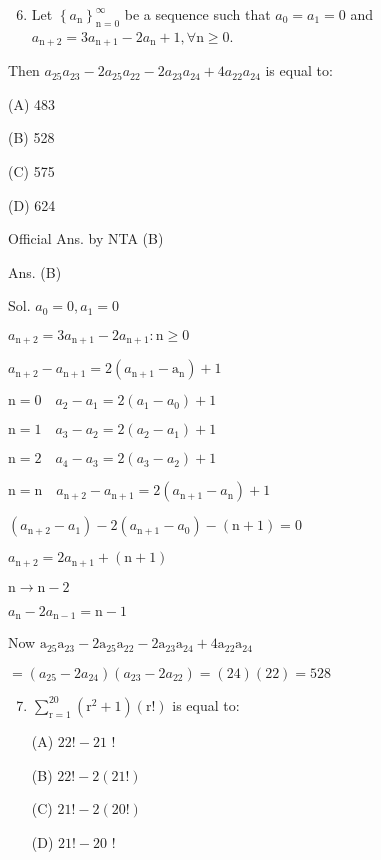 \documentclass[10pt]{article}
\begin{document}
\begin{enumerate}
  \setcounter{enumi}{5}
  \item Let $\left\{a_{\mathrm{n}}\right\}_{\mathrm{n}=0}^{\infty}$ be a sequence such that $a_{0}=a_{1}=0$ and $a_{\mathrm{n}+2}=3 a_{\mathrm{n}+1}-2 a_{\mathrm{n}}+1, \forall \mathrm{n} \geq 0$.
\end{enumerate}

Then $a_{25} a_{23}-2 a_{25} a_{22}-2 a_{23} a_{24}+4 a_{22} a_{24}$ is equal to:

(A) 483

(B) 528

(C) 575

(D) 624

Official Ans. by NTA (B)

Ans. (B)

Sol. $a_{0}=0, a_{1}=0$

$a_{\mathrm{n}+2}=3 a_{\mathrm{n}+1}-2 a_{\mathrm{n}+1}: \mathrm{n} \geq 0$

$a_{\mathrm{n}+2}-a_{\mathrm{n}+1}=2\left(a_{\mathrm{n}+1}-\mathrm{a}_{\mathrm{n}}\right)+1$

$\mathrm{n}=0 \quad a_{2}-a_{1}=2\left(a_{1}-a_{0}\right)+1$

$\mathrm{n}=1 \quad a_{3}-a_{2}=2\left(a_{2}-a_{1}\right)+1$

$\mathrm{n}=2 \quad a_{4}-a_{3}=2\left(a_{3}-a_{2}\right)+1$

$\mathrm{n}=\mathrm{n} \quad a_{\mathrm{n}+2}-a_{\mathrm{n}+1}=2\left(a_{\mathrm{n}+1}-a_{\mathrm{n}}\right)+1$

$\left(a_{\mathrm{n}+2}-a_{1}\right)-2\left(a_{\mathrm{n}+1}-a_{0}\right)-(\mathrm{n}+1)=0$

$a_{\mathrm{n}+2}=2 a_{\mathrm{n}+1}+(\mathrm{n}+1)$

$\mathrm{n} \rightarrow \mathrm{n}-2$

$a_{\mathrm{n}}-2 a_{\mathrm{n}-1}=\mathrm{n}-1$

Now $\mathrm{a}_{25} \mathrm{a}_{23}-2 \mathrm{a}_{25} \mathrm{a}_{22}-2 \mathrm{a}_{23} \mathrm{a}_{24}+4 \mathrm{a}_{22} \mathrm{a}_{24}$

$=\left(a_{25}-2 a_{24}\right)\left(a_{23}-2 a_{22}\right)=(24)(22)=528$

\begin{enumerate}
  \setcounter{enumi}{6}
  \item $\sum_{\mathrm{r}=1}^{20}\left(\mathrm{r}^{2}+1\right)(\mathrm{r} !)$ is equal to:

(A) $22 !-21$ !

(B) $22 !-2(21 !)$

(C) $21 !-2(20 !)$

(D) $21 !-20$ !
\end{enumerate}
\end{document}
